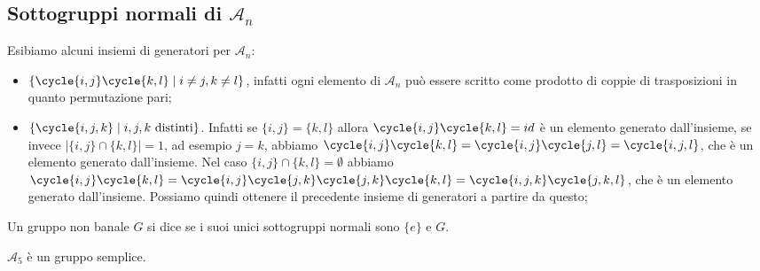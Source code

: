 \documentclass[11pt]{scrartcl}
\begin{document}
\subsection{Sottogruppi normali di $\mathcal{A}_n$}

Esibiamo alcuni insiemi di generatori per $\mathcal{A}_n$:
\begin{itemize}
    \item $\{\cycle{i, j}\cycle{k, l}\mid i\neq j, k \neq l\}$, infatti
    ogni elemento di $\mathcal{A}_n$ può essere scritto come prodotto di 
    coppie di trasposizioni in quanto permutazione pari;
    \item $\{\cycle{i, j, k}\mid i, j, k\text{ distinti}\}$. Infatti se 
    $\{i, j\} = \{k, l\}$ allora $\cycle{i, j}\cycle{k, l} = id$ è un elemento
    generato dall'insieme, se invece $|\{i, j\}\cap\{k, l\}| = 1$, ad esempio $j = k$,
    abbiamo $\cycle{i, j}\cycle{k, l} = \cycle{i, j}\cycle{j, l} = \cycle{i, j, l}$,
    che è un elemento generato dall'insieme. Nel caso $\{i, j\}\cap \{k, l\} = \emptyset$ abbiamo
    $\cycle{i, j}\cycle{k, l} = \cycle{i, j}\cycle{j, k}\cycle{j, k}\cycle{k, l}=
    \cycle{i, j, k}\cycle{j, k, l}$, che è un elemento generato dall'insieme.
    Possiamo quindi ottenere il precedente insieme di generatori a partire
    da questo;
\end{itemize}

\begin{definition}
    Un gruppo non banale $G$ si dice  se i suoi unici sottogruppi
    normali sono $\{e\}$ e $G$.
\end{definition}


\begin{proposition}
    \label{prop3.0}
    $\mathcal{A}_5$ è un gruppo semplice.
\end{proposition}
\end{document}
